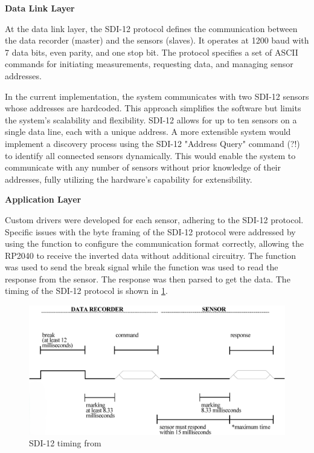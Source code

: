 \textbf{Data Link Layer}

At the data link layer, the SDI-12 protocol defines the communication between the data recorder 
(master) and the sensors (slaves). It operates at 1200 baud with 7 data bits, even parity, and one 
stop bit. The protocol specifies a set of ASCII commands for initiating measurements, requesting 
data, and managing sensor addresses.

In the current implementation, the system communicates with two SDI-12 sensors whose addresses are 
hardcoded. This approach simplifies the software but limits the system's scalability and flexibility. 
SDI-12 allows for up to ten sensors on a single data line, each with a unique address. A more extensible 
system would implement a discovery process using the SDI-12 "Address Query" command (?!) to identify 
all connected sensors dynamically. This would enable the system to communicate with any number of sensors 
without prior knowledge of their addresses, fully utilizing the hardware's capability for extensibility.

\textbf{Application Layer}

Custom drivers were developed for each sensor, adhering to the SDI-12 
protocol. Specific issues with the byte framing of the SDI-12 protocol were addressed by using the 
 function to configure the communication format correctly, allowing the RP2040 
to receive the inverted data without additional circuitry. The  function was used to 
send the break signal while the  function was used to read the response from 
the sensor. The response was then parsed to get the data. The timing of the SDI-12 protocol is shown 
in \cref{sdi12_timing}.

\begin{figure}
    \includegraphics[width=\linewidth]{figures/SDI-12_timing.png}
    \caption{SDI-12 timing from \cite{sdi12_datasheet}}
    \label{sdi12_timing}
\end{figure}

